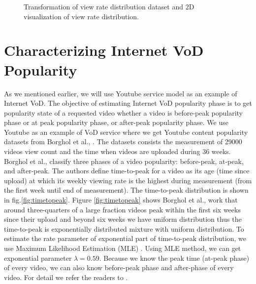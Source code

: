 \documentclass[10pt,final,journal,a4paper]{IEEEtran}
\begin{document}
\begin{figure}[!t]
\centering
{}
\hfill
{}
\caption{Transformation of view rate distribution dataset and 2D visualization of view rate distribution.}
\label{fig:transformand2d}
\end{figure}


\section{Characterizing Internet VoD Popularity}\label{popularity}
As we mentioned earlier, we will use Youtube service model as an example of Internet VoD.
The objective of estimating Internet VoD popularity phase is to get popularity state of a requested video whether a video is before-peak popularity phase or at peak popularity phase, or  after-peak popularity phase.
We use Youtube as an example of VoD service where we get Youtube content popularity datasets from Borghol et al., \cite{Borghol:2011:CMP:2039452.2039717}.
The datasets consists the measurement of 29000 videos view count and the time when videos are uploaded during 36 weeks.
Borghol et al., \cite{Borghol:2011:CMP:2039452.2039717} classify three phases of a video popularity: before-peak, at-peak, and after-peak.
The authors define time-to-peak for a video as its age (time since upload) at which its weekly viewing rate is the highest during measurement (from the first week until end of measurement).
The time-to-peak distribution is shown in fig.\ref{fig:timetopeak}.
Figure \ref{fig:timetopeak} shows Borghol et al., \cite{Borghol:2011:CMP:2039452.2039717} work that around three-quarters of a large fraction videos peak within the first six weeks since their upload and beyond six weeks we have uniform distribution thus the time-to-peak is exponentially distributed mixture with uniform distribution. 
To estimate the rate parameter of exponential part of time-to-peak distribution, we use Maximum Likelihood Estimation (MLE) \cite{clauset2009power}.
Using MLE method, we can get exponential parameter $\lambda = 0.59$.
Because we know the peak time (at-peak phase) of every video, we can also know before-peak phase and after-phase of every video. 
For detail we refer the readers to \cite{Borghol:2011:CMP:2039452.2039717}.
\end{document}
